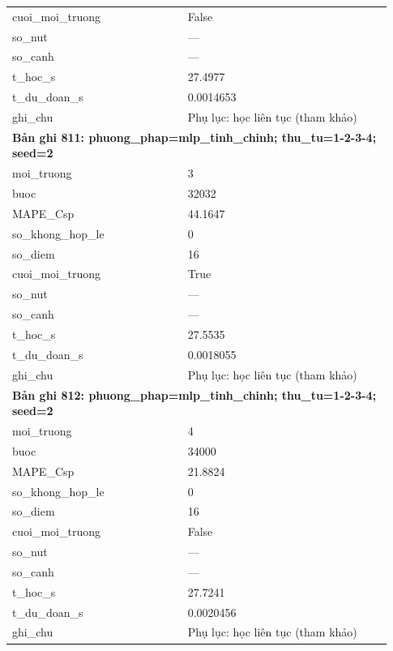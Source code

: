 \begin{longtable}{p{0.43\linewidth}p{0.50\linewidth}}
cuoi\_\allowbreak moi\_\allowbreak truong & False \\
so\_\allowbreak nut & — \\
so\_\allowbreak canh & — \\
t\_\allowbreak hoc\_\allowbreak s & 27.4977 \\
t\_\allowbreak du\_\allowbreak doan\_\allowbreak s & 0.0014653 \\
ghi\_\allowbreak chu & Phụ lục: học liên tục (tham khảo) \\
\midrule
\multicolumn{2}{p{0.95\linewidth}}{\textbf{Bản ghi 811: phuong\_phap=mlp\_tinh\_chinh; thu\_tu=1-2-3-4; seed=2}} \\
moi\_\allowbreak truong & 3 \\
buoc & 32032 \\
MAPE\_\allowbreak Csp & 44.1647 \\
so\_\allowbreak khong\_\allowbreak hop\_\allowbreak le & 0 \\
so\_\allowbreak diem & 16 \\
cuoi\_\allowbreak moi\_\allowbreak truong & True \\
so\_\allowbreak nut & — \\
so\_\allowbreak canh & — \\
t\_\allowbreak hoc\_\allowbreak s & 27.5535 \\
t\_\allowbreak du\_\allowbreak doan\_\allowbreak s & 0.0018055 \\
ghi\_\allowbreak chu & Phụ lục: học liên tục (tham khảo) \\
\midrule
\multicolumn{2}{p{0.95\linewidth}}{\textbf{Bản ghi 812: phuong\_phap=mlp\_tinh\_chinh; thu\_tu=1-2-3-4; seed=2}} \\
moi\_\allowbreak truong & 4 \\
buoc & 34000 \\
MAPE\_\allowbreak Csp & 21.8824 \\
so\_\allowbreak khong\_\allowbreak hop\_\allowbreak le & 0 \\
so\_\allowbreak diem & 16 \\
cuoi\_\allowbreak moi\_\allowbreak truong & False \\
so\_\allowbreak nut & — \\
so\_\allowbreak canh & — \\
t\_\allowbreak hoc\_\allowbreak s & 27.7241 \\
t\_\allowbreak du\_\allowbreak doan\_\allowbreak s & 0.0020456 \\
ghi\_\allowbreak chu & Phụ lục: học liên tục (tham khảo) \\

\end{longtable}
